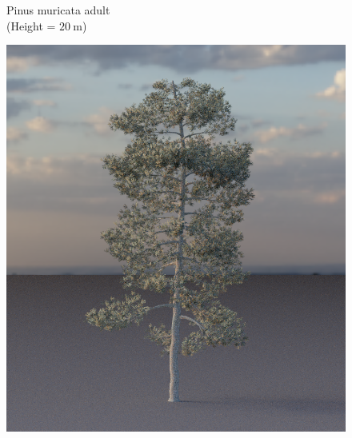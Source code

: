 \begin{figure}[t]
\begin{center}
        \begin{minipage}[c]{0.24\textwidth}
            \begin{flushleft}
                Pinus muricata adult \\
                (Height = $\SI{20}{\m}$)
            \end{flushleft}
        \end{minipage}
        \begin{minipage}[c]{0.24\textwidth}
            \includegraphics[valign=c, width=\linewidth]{img/CL13a_mesh.png}
        \end{minipage}
        \begin{minipage}[c]{0.24\textwidth}

\end{minipage}
\end{center}
\end{figure}
